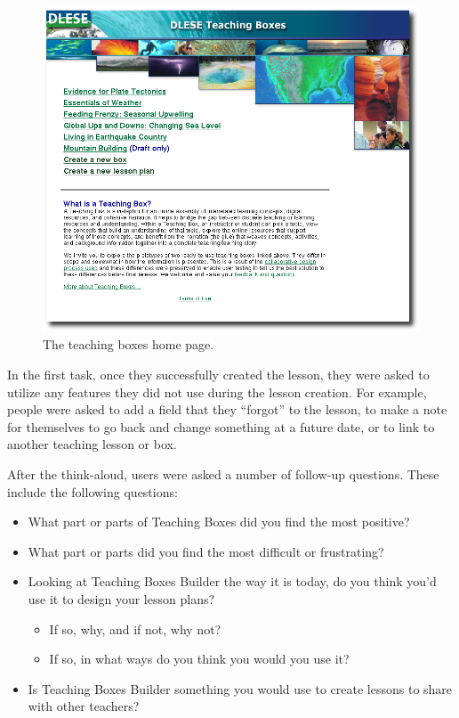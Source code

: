 \documentclass[10pt,letter]{article}
\begin{document}
\begin{figure}[htb]
	\centering
	\includegraphics[width=0.9\linewidth]{figures/teaching_boxes_home}
	\caption{The teaching boxes home page.}
	\label{fig: homepage}
\end{figure}

In the first task, once they successfully created the lesson, they were asked to
utilize any features they did not use during the lesson creation. For example,
people were asked to add a field that they ``forgot'' to the lesson, to make a
note for themselves to go back and change something at a future date, or to link
to another teaching lesson or box.

After the think-aloud, users were asked a number of follow-up questions.  These include
the following questions:

\begin{itemize}
\item What part or parts of Teaching Boxes did you find the most positive?
\item What part or parts did you find the most difficult or frustrating?
\item Looking at Teaching Boxes Builder the way it is today, do you think you'd
      use it to design your lesson plans?
      \begin{itemize}
	  \item If so, why, and if not, why not?
	  \item If so, in what ways do you think you would you use it?
	  \end{itemize}
\item Is Teaching Boxes Builder something you would use to create lessons to
	  share with other teachers?
\end{itemize}
\end{document}
